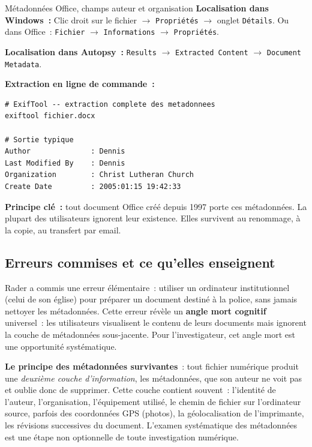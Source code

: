 \begin{boxartefact}{Métadonnées Office, champs auteur et organisation}
\textbf{Localisation dans Windows~:}
Clic droit sur le fichier $\to$ \texttt{Propriétés} $\to$
onglet \texttt{Détails}. Ou dans Office~: \texttt{Fichier} $\to$
\texttt{Informations} $\to$ \texttt{Propriétés}.

\textbf{Localisation dans Autopsy~:}
\texttt{Results} $\to$ \texttt{Extracted Content} $\to$
\texttt{Document Metadata}.

\textbf{Extraction en ligne de commande~:}
\begin{lstlisting}[language=bash_forensique]
# ExifTool -- extraction complete des metadonnees
exiftool fichier.docx

# Sortie typique
Author              : Dennis
Last Modified By    : Dennis
Organization        : Christ Lutheran Church
Create Date         : 2005:01:15 19:42:33
\end{lstlisting}

\textbf{Principe clé~:} tout document Office créé depuis 1997 porte ces
métadonnées. La plupart des utilisateurs ignorent leur existence.
Elles survivent au renommage, à la copie, au transfert par email.
\end{boxartefact}

\subsection{Erreurs commises et ce qu'elles enseignent}

Rader a commis une erreur élémentaire~: utiliser un ordinateur institutionnel
(celui de son église) pour préparer un document destiné à la police, sans
jamais nettoyer les métadonnées. Cette erreur révèle un \textbf{angle mort
cognitif} universel~: les utilisateurs visualisent le contenu de leurs
documents mais ignorent la couche de métadonnées sous-jacente. Pour
l'investigateur, cet angle mort est une opportunité systématique.

\begin{boxalert}
\textbf{Le principe des métadonnées survivantes}~: tout fichier numérique
produit une \emph{deuxième couche d'information}, les métadonnées, que
son auteur ne voit pas et oublie donc de supprimer. Cette couche contient
souvent~: l'identité de l'auteur, l'organisation, l'équipement utilisé,
le chemin de fichier sur l'ordinateur source, parfois des coordonnées GPS
(photos), la géolocalisation de l'imprimante, les révisions successives du
document. L'examen systématique des métadonnées est une étape non
optionnelle de toute investigation numérique.
\end{boxalert}

